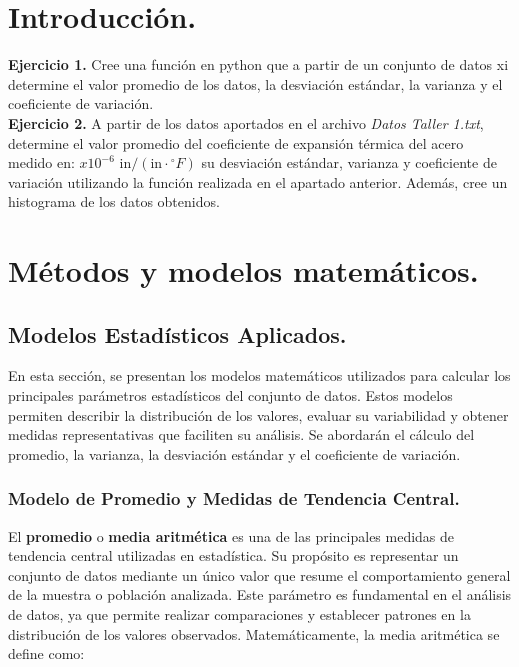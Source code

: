 \documentclass{article}
\begin{document}
\newpage
\section{Introducción.}
\textbf{Ejercicio 1.} Cree una función en python que a partir de un conjunto de datos xi determine el valor promedio de los datos, la desviación estándar, la varianza y el coeficiente de variación.\\

\textbf{Ejercicio 2.} A partir de los datos aportados en el archivo \textit{Datos Taller 1.txt}, determine el valor promedio del coeficiente de expansión térmica del acero medido en:
$x 10^{-6} \text{ in}/(\text{in} \cdot {}^{\circ}F)$ su desviación estándar, varianza y coeficiente de variación utilizando la función realizada en el apartado anterior. Además, cree un histograma de los datos obtenidos.


\newpage
\section{Métodos y modelos matemáticos.}
\subsection{Modelos Estadísticos Aplicados.}
En esta sección, se presentan los modelos matemáticos utilizados para calcular los principales parámetros estadísticos del conjunto de datos. Estos modelos permiten describir la distribución de los valores, evaluar su variabilidad y obtener medidas representativas que faciliten su análisis. Se abordarán el cálculo del promedio, la varianza, la desviación estándar y el coeficiente de variación.
\subsubsection{Modelo de Promedio y Medidas de Tendencia Central.}
El \textbf{promedio} o \textbf{media aritmética} es una de las principales medidas de tendencia central utilizadas en estadística. Su propósito es representar un conjunto de datos mediante un único valor que resume el comportamiento general de la muestra o población analizada. Este parámetro es fundamental en el análisis de datos, ya que permite realizar comparaciones y establecer patrones en la distribución de los valores observados. Matemáticamente, la media aritmética se define como:
\end{document}

